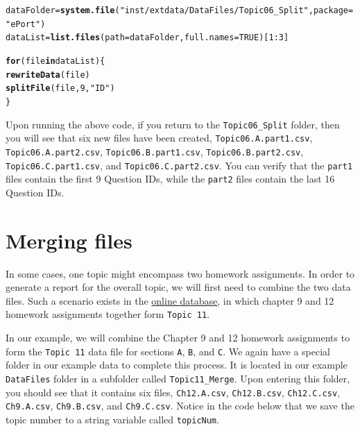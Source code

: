 \documentclass[11pt,a4paper,oldfontcommands,openany]{memoir}
\makeatletter
\newcommand{\hlnum}[1]{\textcolor[rgb]{0.686,0.059,0.569}{#1}}%
\newcommand{\hlstr}[1]{\textcolor[rgb]{0.192,0.494,0.8}{#1}}%
\newcommand{\hlopt}[1]{\textcolor[rgb]{0,0,0}{#1}}%
\newcommand{\hlstd}[1]{\textcolor[rgb]{0.345,0.345,0.345}{#1}}%
\newcommand{\hlkwa}[1]{\textcolor[rgb]{0.161,0.373,0.58}{\textbf{#1}}}%
\newcommand{\hlkwb}[1]{\textcolor[rgb]{0.69,0.353,0.396}{#1}}%
\newcommand{\hlkwc}[1]{\textcolor[rgb]{0.333,0.667,0.333}{#1}}%
\newcommand{\hlkwd}[1]{\textcolor[rgb]{0.737,0.353,0.396}{\textbf{#1}}}%
\newenvironment{kframe}{%
 \def\at@end@of@kframe{}%
 \ifinner\ifhmode%
  \def\at@end@of@kframe{\end{minipage}}%
  \begin{minipage}{\columnwidth}%
 \fi\fi%
 \def\FrameCommand##1{\hskip\@totalleftmargin \hskip-\fboxsep
 \colorbox{shadecolor}{##1}\hskip-\fboxsep
     \hskip-\linewidth \hskip-\@totalleftmargin \hskip\columnwidth}%
 \MakeFramed {\advance\hsize-\width
   \@totalleftmargin\z@ \linewidth\hsize
   \@setminipage}}%
 {\par\unskip\endMakeFramed%
 \at@end@of@kframe}
\newenvironment{knitrout}{}{} %
\numberwithin{equation}{section} %
\makeatother
\begin{document}
\begin{knitrout}
\color{fgcolor}\begin{kframe}
\begin{alltt}
\hlstd{dataFolder} \hlkwb{=} \hlkwd{system.file}\hlstd{(}\hlstr{"inst/extdata/DataFiles/Topic06_Split"}\hlstd{,} \hlkwc{package} \hlstd{=} \hlstr{"ePort"}\hlstd{)}
\hlstd{dataList} \hlkwb{=} \hlkwd{list.files}\hlstd{(}\hlkwc{path} \hlstd{= dataFolder,} \hlkwc{full.names} \hlstd{=} \hlnum{TRUE}\hlstd{)[}\hlnum{1}\hlopt{:}\hlnum{3}\hlstd{]}

\hlkwa{for}\hlstd{(file} \hlkwa{in} \hlstd{dataList)\{}
  \hlkwd{rewriteData}\hlstd{(file)}
  \hlkwd{splitFile}\hlstd{(file,} \hlnum{9}\hlstd{,} \hlstr{"ID"}\hlstd{)}
\hlstd{\}}
\end{alltt}
\end{kframe}
\end{knitrout}

Upon running the above code, if you return to the \texttt{Topic06\_Split} folder, then you will see that six new files have been created, \texttt{Topic06.A.part1.csv}, \texttt{Topic06.A.part2.csv}, \texttt{Topic06.B.part1.csv}, \texttt{Topic06.B.part2.csv}, \texttt{Topic06.C.part1.csv}, and \texttt{Topic06.C.part2.csv}. You can verify that the \texttt{part1} files contain the first 9 Question IDs, while the \texttt{part2} files contain the last 16 Question IDs.

\section{Merging files}

In some cases, one topic might encompass two homework assignments. In order to generate a report for the overall topic, we will first need to combine the two data files. Such a scenario exists in the \hyperref[sec:OnlineHomework]{online database}, in which chapter 9 and 12 homework assignments together form \texttt{Topic 11}.

In our example, we will combine the Chapter 9 and 12 homework assignments to form the \texttt{Topic 11} data file for sections \texttt{A}, \texttt{B}, and \texttt{C}. We again have a special folder in our example data to complete this process. It is located in our example \texttt{DataFiles} folder in a subfolder called \texttt{Topic11\_Merge}. Upon entering this folder, you should see that it contains six files, \texttt{Ch12.A.csv}, \texttt{Ch12.B.csv}, \texttt{Ch12.C.csv}, \texttt{Ch9.A.csv}, \texttt{Ch9.B.csv}, and \texttt{Ch9.C.csv}. Notice in the code below that we save the topic number to a string variable called \texttt{topicNum}. \\
\end{document}
